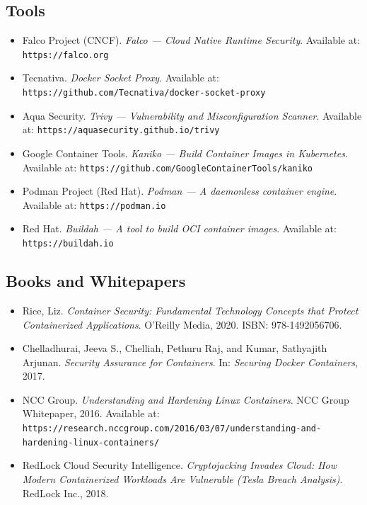 \subsection{Tools}

\begin{itemize}

    \item Falco Project (CNCF).
    \textit{Falco --- Cloud Native Runtime Security}.
    Available at: \texttt{https://falco.org}

    \item Tecnativa.
    \textit{Docker Socket Proxy}.
    Available at:
    \texttt{https://github.com/Tecnativa/docker-socket-proxy}

    \item Aqua Security.
    \textit{Trivy --- Vulnerability and Misconfiguration Scanner}.
    Available at: \texttt{https://aquasecurity.github.io/trivy}

    \item Google Container Tools.
    \textit{Kaniko --- Build Container Images in Kubernetes}.
    Available at:
    \texttt{https://github.com/GoogleContainerTools/kaniko}

    \item Podman Project (Red Hat).
    \textit{Podman --- A daemonless container engine}.
    Available at: \texttt{https://podman.io}

    \item Red Hat.
    \textit{Buildah --- A tool to build OCI container images}.
    Available at: \texttt{https://buildah.io}

\end{itemize}

\subsection{Books and Whitepapers}

\begin{itemize}

    \item Rice, Liz.
    \textit{Container Security: Fundamental Technology Concepts
    that Protect Containerized Applications}.
    O'Reilly Media, 2020.
    ISBN: 978-1492056706.

    \item Chelladhurai, Jeeva S., Chelliah, Pethuru Raj,
    and Kumar, Sathyajith Arjunan.
    \textit{Security Assurance for Containers}.
    In: \textit{Securing Docker Containers}, 2017.

    \item NCC Group.
    \textit{Understanding and Hardening Linux Containers}.
    NCC Group Whitepaper, 2016.
    Available at:
    \texttt{https://research.nccgroup.com/2016/03/07/understanding-and-hardening-linux-containers/}

    \item RedLock Cloud Security Intelligence.
    \textit{Cryptojacking Invades Cloud: How Modern Containerized
    Workloads Are Vulnerable (Tesla Breach Analysis)}.
    RedLock Inc., 2018.

\end{itemize}

